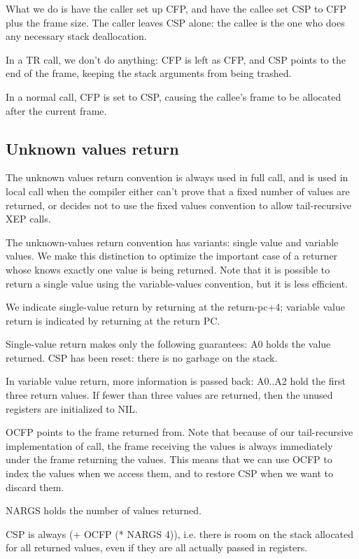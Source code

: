 What we do is have the caller set up CFP, and have the callee set CSP to CFP
plus the frame size.  The caller leaves CSP alone: the callee is the one who
does any necessary stack deallocation.

In a TR call, we don't do anything: CFP is left as CFP, and CSP points to the
end of the frame, keeping the stack arguments from being trashed.

In a normal call, CFP is set to CSP, causing the callee's frame to be allocated
after the current frame.


\subsection{Unknown values return}

The unknown values return convention is always used in full call, and is used
in local call when the compiler either can't prove that a fixed number of
values are returned, or decides not to use the fixed values convention to allow
tail-recursive XEP calls.

The unknown-values return convention has variants: single value and variable
values.  We make this distinction to optimize the important case of a returner
whose knows exactly one value is being returned.  Note that it is possible to
return a single value using the variable-values convention, but it is less
efficient.

We indicate single-value return by returning at the return-pc+4; variable value
return is indicated by returning at the return PC.

Single-value return makes only the following guarantees:
    A0 holds the value returned.
    CSP has been reset: there is no garbage on the stack.

In variable value return, more information is passed back:
    A0..A2 hold the first three return values.  If fewer than three values are
    returned, then the unused registers are initialized to NIL.

    OCFP points to the frame returned from.  Note that because of our
    tail-recursive implementation of call, the frame receiving the values is
    always immediately under the frame returning the values.  This means that
    we can use OCFP to index the values when we access them, and to restore
    CSP when we want to discard them.

    NARGS holds the number of values returned.

    CSP is always (+ OCFP (* NARGS 4)), i.e. there is room on the stack
    allocated for all returned values, even if they are all actually passed in
    registers.

